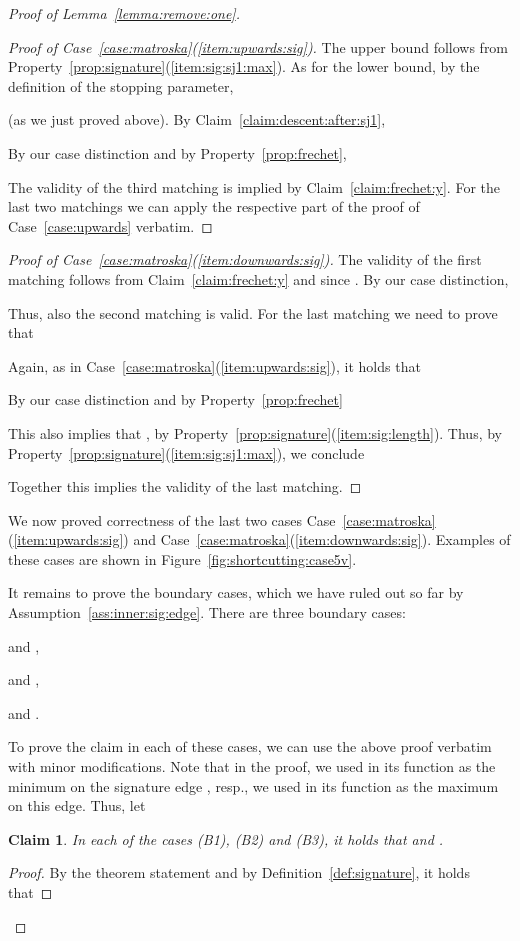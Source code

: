 \documentclass[11pt, letter]{article}
\newtheorem{claim}[theorem]{Claim}
\newcommand{\lemref}[1]{Lemma~\ref{lemma:#1}}
\newcommand{\figref}[1]{Figure~\ref{fig:#1}}
\newcommand{\defref}[1]{Definition~\ref{def:#1}}
\newcommand{\caseref}[1]{Case~\ref{case:#1}}
\newcommand{\claimlab}[1]{\label{claim:#1}}
\newcommand{\claimref}[1]{Claim~\ref{claim:#1}}
\newcommand{\assref}[1]{Assumption~\ref{ass:#1}}
\newcommand{\propref}[1]{Property~\ref{prop:#1}}
\begin{document}
\begin{proof}[Proof of \lemref{remove:one}]
\begin{proof}[Proof of \caseref{matroska}(\ref{item:upwards:sig})]
The upper bound follows from \propref{signature}(\ref{item:sig:sj1:max}).
As for the lower bound, by the definition of the stopping parameter,

(as we just proved above).
By \claimref{descent:after:sj1}, 

By our case distinction and by \propref{frechet},

The validity of the third matching is implied by \claimref{frechet:y}.
For the last two matchings we can apply the respective part of the proof of
\caseref{upwards} verbatim.
\end{proof}

\begin{proof}[Proof of \caseref{matroska}(\ref{item:downwards:sig})]
The validity of the first matching follows from \claimref{frechet:y} and
since .
By our case distinction,

Thus, also the second matching is valid.
For the last matching we need to prove that

Again, as in \caseref{matroska}(\ref{item:upwards:sig}), it holds that 

By our case distinction and by \propref{frechet} 

This also implies that , by
\propref{signature}(\ref{item:sig:length}). 
Thus, by \propref{signature}(\ref{item:sig:sj1:max}), we conclude

Together this implies the validity of the last matching.
\end{proof}

We now proved correctness of the last two cases
\caseref{matroska}(\ref{item:upwards:sig}) and
\caseref{matroska}(\ref{item:downwards:sig}).  Examples of these cases are shown
in \figref{shortcutting:case5v}.

It remains to prove the boundary cases, which we have ruled out so far by
\assref{inner:sig:edge}. There are three boundary cases:
\begin{compactenum}[(B1)]
\item  and ,
\item  and ,
\item  and .
\end{compactenum}

To prove the claim in each of these cases, we can use the above proof verbatim
with minor modifications.  Note that in the proof, we used  in its function
as the minimum on the signature edge , resp., we used
 in its function as the maximum
on this edge.  Thus, let
 

\begin{claim}
In each of the cases (B1), (B2) and (B3), it holds that
 and .
\claimlab{pi:inside}
\end{claim}
\begin{proof}
By the theorem statement and by \defref{signature}, it holds that


\end{proof}
\end{proof}
\end{document}
